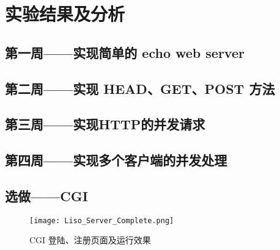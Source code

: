 \chapter{实验结果及分析}


\section{第一周——实现简单的 echo web server}

\section{第二周——实现 HEAD、GET、POST 方法}

\section{第三周——实现HTTP的并发请求}

\section{第四周——实现多个客户端的并发处理}

\section{选做——CGI}


\begin{figure}[htbp!]
    \centering
    \texttt{[image: Liso\_Server\_Complete.png]}
    \caption{CGI 登陆、注册页面及运行效果}\label{fig:CGI1}
  \end{figure}

